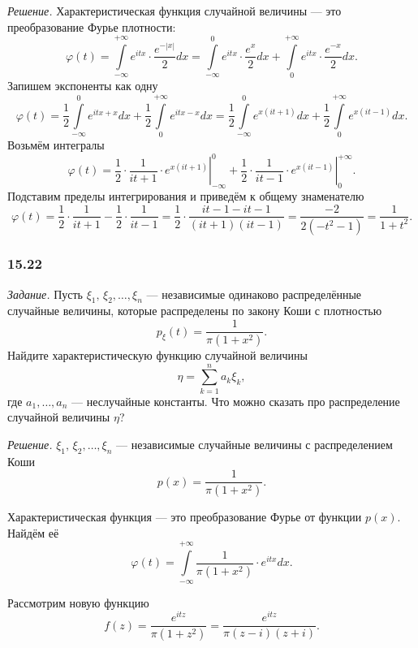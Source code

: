 \textit{Решение.} Характеристическая функция случайной величины --- это преобразование Фурье плотности:
$$ \varphi \left( t \right) =
\int \limits_{- \infty }^{+ \infty } e^{itx} \cdot \frac{e^{- \left| x \right| }}{2} dx =
\int \limits_{- \infty }^0 e^{itx} \cdot \frac{e^x}{2} dx + \int \limits_0^{+ \infty } e^{itx} \cdot \frac{e^{- x}}{2} dx.$$
Запишем экспоненты как одну
$$ \varphi \left( t \right) =
\frac{1}{2} \int \limits_{- \infty }^0 e^{itx + x} dx + \frac{1}{2} \int \limits_0^{+ \infty } e^{itx - x} dx =
\frac{1}{2} \int \limits_{- \infty }^0 e^{x \left( it + 1 \right) } dx + \frac{1}{2} \int \limits_0^{+ \infty } e^{x \left( it - 1 \right) }dx.$$
Возьмём интегралы
$$ \varphi \left( t \right) =
\frac{1}{2} \cdot \left. \frac{1}{it + 1} \cdot e^{x \left( it + 1 \right) } \right|_{- \infty }^0 +
\frac{1}{2} \cdot \left. \frac{1}{it - 1} \cdot e^{x \left( it - 1 \right) } \right|_0^{+ \infty }.$$
Подставим пределы интегрирования и приведём к общему знаменателю
$$ \varphi \left( t \right) =
\frac{1}{2} \cdot \frac{1}{it + 1} - \frac{1}{2} \cdot \frac{1}{it - 1} =
\frac{1}{2} \cdot \frac{it - 1 - it - 1}{ \left( it + 1 \right) \left( it - 1 \right) } =
\frac{- 2}{2 \left( - t^2 - 1 \right) } =
\frac{1}{1 + t^2}.$$

\subsubsection*{15.22}

\textit{Задание.} Пусть $ \xi_1, \, \xi_2, \dotsc, \xi_n$ --- независимые одинаково распределённые случайные величины, которые распределены по закону Коши с плотностью
$$p_{ \xi } \left( t \right) =
\frac{1}{ \pi \left( 1 + x^2 \right) }.$$
Найдите характеристическую функцию случайной величины
$$ \eta =
\sum \limits_{k=1}^n a_k \xi_k,$$
где $a_1, \dotsc, a_n$ --- неслучайные константы.
Что можно сказать про распределение случайной величины $ \eta $?

\textit{Решение.} $ \xi_1, \, \xi_2, \dotsc, \xi_n$ --- независимые случайные величины с распределением Коши
$$p \left( x \right) =
\frac{1}{ \pi \left( 1 + x^2 \right) }.$$

Характеристическая функция --- это преобразование Фурье от функции $p \left( x \right) $.
Найдём её
$$ \varphi \left( t \right) =
\int \limits_{- \infty }^{+ \infty } \frac{1}{ \pi \left( 1 + x^2 \right) } \cdot e^{itx} dx.$$

Рассмотрим новую функцию
$$f \left( z \right) =
\frac{e^{itz}}{ \pi \left( 1 + z^2 \right) } =
\frac{e^{itz}}{ \pi \left( z - i \right) \left( z + i \right) }.$$

